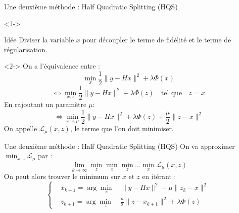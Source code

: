 \documentclass[11pt]{beamer}
\begin{document}
\begin{frame}{Une deuxième méthode : Half Quadratic Splitting (HQS)}
    \begin{visibleenv}<1->
        \begin{exampleblock}{Idée}
            Diviser la variable $x$ pour découpler le terme de fidélité et le terme de régularisation.
        \end{exampleblock}
    \end{visibleenv}
    \begin{visibleenv}<2->
        On a l'équivalence entre :
        $$ \min_x \frac{1}{2}\lVert y-Hx \rVert^2 + \lambda \Phi(x) $$
        $$ \Leftrightarrow \min_{x, z} \frac{1}{2}\lVert y-Hx \rVert ^2 + \lambda \Phi(z) \quad \text{tel que} \quad  z=x$$
        En rajoutant un paramètre $\mu$:
        $$ \Leftrightarrow \min_{x, z, \mu}  \frac{1}{2}\lVert y-Hx \rVert ^2+\lambda \Phi(z) + \frac{\mu}{2}\lVert z-x \rVert ^2 $$
        On appelle $\mathcal{L}_{\mu}(x,z)$, le terme que l'on doit minimiser.
    \end{visibleenv}
\end{frame}

\begin{frame}{Une deuxième méthode : Half Quadratic Splitting (HQS)}
    On va approximer $\displaystyle \min_{x, z} \mathcal{L}_{\mu}$ par :
    $$ \lim_{k \rightarrow \infty} \min_z \min_x \min_z \dots \min_x \mathcal{L}_{\mu}(x,z)$$
    On peut alors trouver le minimum sur $x$ et $z$ en itérant :
    \begin{equation*}
        \left\{
        \begin{aligned}
            & x_{k+1} = \arg \min_x \quad \lVert y - Hx \rVert^2 + \mu \lVert z_k - x \rVert^2 \\
            & z_{k+1} = \arg \min_z \quad \frac{\mu}{2}\lVert z - x_{k+1} \rVert^2 + \lambda \Phi(z)
        \end{aligned}
        \right.
    \end{equation*}
\end{frame}
\end{document}
